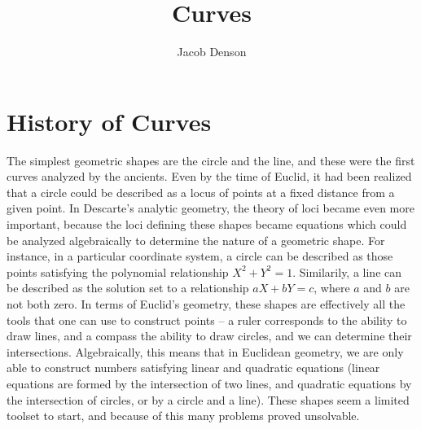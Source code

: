 

\title{Curves}
\author{Jacob Denson}



\maketitle
\tableofcontents
{}

\chapter{History of Curves}

The simplest geometric shapes are the circle and the line, and these were the first curves analyzed by the ancients. Even by the time of Euclid, it had been realized that a circle could be described as a locus of points at a fixed distance from a given point. In Descarte's analytic geometry, the theory of loci became even more important, because the loci defining these shapes became equations which could be analyzed algebraically to determine the nature of a geometric shape. For instance, in a particular coordinate system, a circle can be described as those points satisfying the polynomial relationship $X^2 + Y^2 = 1$. Similarily, a line can be described as the solution set to a relationship $aX + bY = c$, where $a$ and $b$ are not both zero. In terms of Euclid's geometry, these shapes are effectively all the tools that one can use to construct points -- a ruler corresponds to the ability to draw lines, and a compass the ability to draw circles, and we can determine their intersections. Algebraically, this means that in Euclidean geometry, we are only able to construct numbers satisfying linear and quadratic equations (linear equations are formed by the intersection of two lines, and quadratic equations by the intersection of circles, or by a circle and a line). These shapes seem a limited toolset to start, and because of this many problems proved unsolvable.
%
